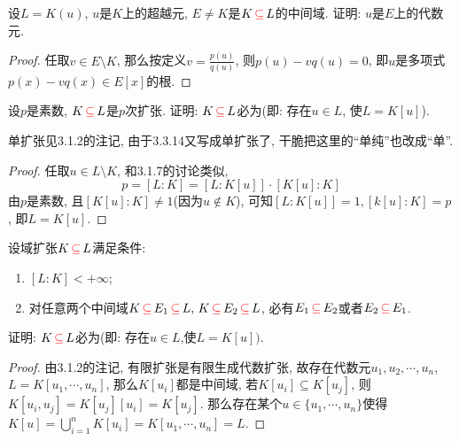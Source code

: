 \documentclass{../solutions-cn}
\begin{document}
\begin{exercise}[习题3.1.10]
    设$L = K(u)$, $u$是$K$上的超越元, $E \neq K$是$K \,\textcolor{red}{\subseteq}\, L$的中间域. 证明: $u$是$E$上的代数元.
\end{exercise}

\begin{proof}
    任取$v \in E \setminus K$, 那么按定义$v = \frac{p(u)}{q(u)}$, 则$p(u) - vq(u) = 0$, 即$u$是多项式$p(x) - vq(x) \in E[x]$的根.
\end{proof}

\begin{exercise}[习题3.1.11]
    设$p$是素数, $K \,\textcolor{red}{\subseteq}\, L$是$p$次扩张. 证明: $K \,\textcolor{red}{\subseteq}\, L$必为(即: 存在$u \in L$, 使$L = K[u]$).
\end{exercise}

\begin{remark}
    单扩张见3.1.2的注记, 由于3.3.14又写成单扩张了, 干脆把这里的“单纯”也改成“单”.
\end{remark}

\begin{proof}
    任取$u \in L \setminus K$, 和3.1.7的讨论类似,
    \[
        p = [L:K] = [L:K[u]] \cdot [K[u]:K]
    \]
    由$p$是素数, 且$[K[u]:K] \neq 1$(因为$u \notin K$), 可知$[L:K[u]] = 1, [k[u]:K] = p$, 即$L = K[u]$.
\end{proof}

\begin{exercise}[习题3.1.12]
    设域扩张$K \,\textcolor{red}{\subseteq}\, L$满足条件:
    \begin{enumerate}[(1)]
        \item $[L:K] < +\infty$;
        \item 对任意两个中间域$K \,\textcolor{red}{\subseteq}\, E_1 \,\textcolor{red}{\subseteq}\, L,\, K \,\textcolor{red}{\subseteq}\, E_2 \,\textcolor{red}{\subseteq}\, L$, 必有$E_1 \,\textcolor{red}{\subseteq}\, E_2$或者$E_2 \,\textcolor{red}{\subseteq}\, E_1$.
    \end{enumerate}
    证明: $K \,\textcolor{red}{\subseteq}\, L$必为(即: 存在$u \in L$,使$L = K[u])$.
\end{exercise}

\begin{proof}
    由3.1.2的注记, 有限扩张是有限生成代数扩张, 故存在代数元$u_1, u_2, \cdots, u_n$, $L = K[u_1, \cdots, u_n]$, 那么$K[u_i]$都是中间域, 若$K[u_i] \subseteq K[u_j]$, 则$K[u_i, u_j] = K[u_j][u_i] = K[u_j]$. 那么存在某个$u \in \{u_1, \cdots, u_n\}$使得$K[u] = \bigcup_{i = 1}^{n} K[u_i] = K[u_1, \cdots, u_n] = L$.
\end{proof}
\end{document}
